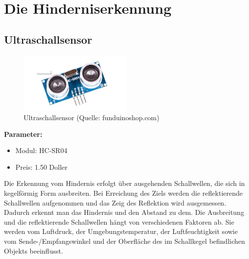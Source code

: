 \renewcommand{\autoren}{Valentyn Chepil}
\newpage
\section{Die Hinderniserkennung}
\subsection{Ultraschallsensor}

\begin{figure}[!h]  %
	\centering\includegraphics[width=0.5\textwidth]{images/Bild-1-1.png}
	\caption{Ultraschallsensor \newline(Quelle: funduinoshop.com)}
	\label{bild_1.1} %
\end{figure}

\textbf{Parameter:}  %
\begin{itemize}
	\item Modul: HC-SR04
	\item Preis:  1.50 Doller
\end{itemize}

Die Erkennung vom Hindernis erfolgt über ausgehenden Schallwellen, die sich in kegelförmig Form  ausbreiten. Bei Erreichung des Ziels werden die reflektierende Schallwellen aufgenommen und das Zeig des Reflektion wird ausgemessen. Dadurch erkennt man das Hindernis und den Abstand zu dem. Die Ausbreitung und die reflektierende Schallwellen hängt von verschiedenen Faktoren ab. Sie werden vom Luftdruck, der Umgebungstemperatur, der Luftfeuchtigkeit sowie vom Sende-/Empfangswinkel und der Oberfläche des im Schallkegel befindlichen Objekts
beeinflusst.


